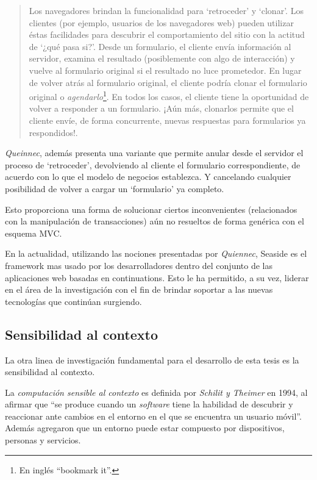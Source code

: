 \begin{quote}
Los navegadores brindan la funcionalidad para `retroceder' y `clonar'. Los clientes (por ejemplo, usuarios de los navegadores web) pueden utilizar éstas facilidades para descubrir el comportamiento del sitio con la actitud de `¿qué pasa si?'. Desde un formulario, el cliente envía información al servidor, examina el resultado (posiblemente con algo de interacción) y vuelve al formulario original si el resultado no luce prometedor. En lugar de volver atrás al formulario original, el cliente podría clonar el formulario original o \emph{agendarlo}\footnote{En inglés ``bookmark it''.}. En todos los casos, el cliente tiene la oportunidad de volver a responder a un formulario. ¡Aún más, clonarlos permite que el cliente envíe, de forma concurrente, nuevas respuestas para formularios ya respondidos!.\cite[p.~2]{Queinnec01}
\end{quote}

\emph{Queinnec}, además presenta una variante que permite anular desde el servidor el proceso de `retroceder', devolviendo al cliente el formulario correspondiente, de acuerdo con lo que el modelo de negocios establezca. Y cancelando cualquier posibilidad de volver a cargar un `formulario' ya completo.

Esto proporciona una forma de solucionar ciertos inconvenientes (relacionados con la manipulación de transacciones) aún no resueltos de forma genérica con el esquema MVC.

En la actualidad, utilizando las nociones presentadas por \emph{Quiennec}, Seaside es el framework mas usado por los desarrolladores dentro del conjunto de las aplicaciones web basadas en continuations. Esto le ha permitido, a su vez, liderar en el área de la investigación con el fin de brindar soportar a las nuevas tecnologías que continúan surgiendo.


\subsection{Sensibilidad al contexto}

La otra linea de investigación fundamental para el desarrollo de esta tesis es la sensibilidad al contexto.

La \emph{computación sensible al contexto} es definida por \emph{Schilit y Theimer} en 1994, al afirmar que ``se produce cuando un \emph{software} tiene la habilidad de descubrir y reaccionar ante cambios en el entorno en el que se encuentra un usuario móvil''\cite[p.~23]{Schilit94}. Además agregaron que un entorno puede estar compuesto por dispositivos, personas y servicios.

